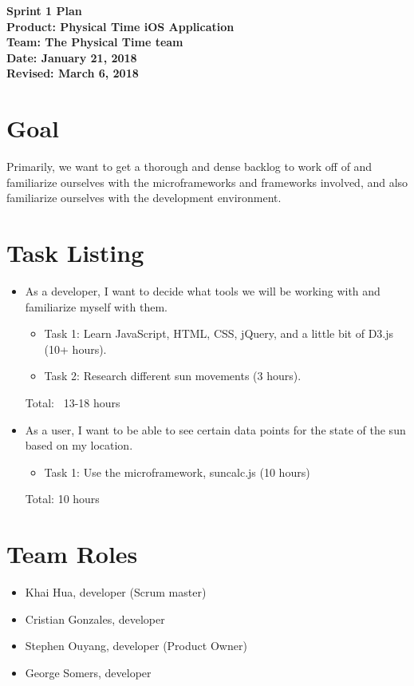 \documentclass[11pt]{article}
\newcommand\tab[1][1cm]{\hspace*{#1}}
\begin{document}
	\Large{\textbf{Sprint 1 Plan}}\\
	\Large{\textbf{Product: Physical Time iOS Application}}\\
	\Large{\textbf{Team: The Physical Time team}}\\
	\Large{\textbf{Date: January 21, 2018}}\\
	\Large{\textbf{Revised: March 6, 2018}}\\
	
	\vspace{-3mm}
	
	\section{Goal}
		\vspace{-3mm}
		\tab \normalsize{Primarily, we want to get a thorough and dense backlog to work off of and familiarize ourselves with the microframeworks and frameworks involved, and also familiarize ourselves with the development environment.}
		
	\section{Task Listing}
		\vspace{-3mm}
		\begin{itemize}
			\item As a developer, I want to decide what tools we will be working with and familiarize myself with them.
			\begin{itemize}
			    \item Task 1: Learn JavaScript, HTML, CSS, jQuery, and a little bit of D3.js (10+ hours).
			    \item Task 2: Research different sun movements (3 hours).
			\end{itemize}
			Total: ~13-18 hours
			\item As a user, I want to be able to see certain data points for the state of the sun based on my location.
			\begin{itemize}
			    \item Task 1: Use the microframework, suncalc.js (10 hours)
			\end{itemize}
			Total: 10 hours
		\end{itemize}
		
	\section{Team Roles}
		\vspace{-3mm}
		\begin{itemize}
		    \item Khai Hua, developer (Scrum master)
		    \item Cristian Gonzales, developer
		    \item Stephen Ouyang, developer (Product Owner)
		    \item George Somers, developer
		\end{itemize}
\end{document}

